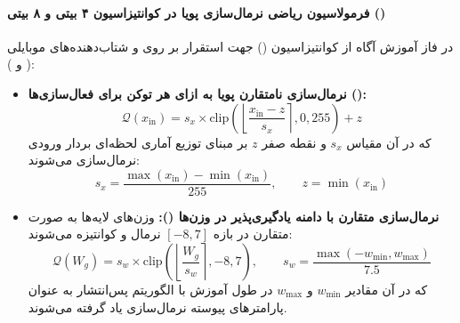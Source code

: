 \paragraph*{فرمولاسیون ریاضی نرمال‌سازی پویا در کوانتیزاسیون ۴ بیتی و ۸ بیتی ()}
در فاز آموزش آگاه از کوانتیزاسیون () جهت استقرار بر روی  و شتاب‌دهنده‌های موبایلی ( و ):
\begin{itemize}
    \item \textbf{نرمال‌سازی نامتقارن پویا به ازای هر توکن برای فعال‌سازی‌ها ():}
    \begin{equation}
        \mathcal{Q}(x_{\text{in}}) = s_x \times \text{clip}\left( \left\lfloor \frac{x_{\text{in}} - z}{s_x} \right\rceil, 0, 255 \right) + z
    \end{equation}
    که در آن مقیاس $s_x$ و نقطه صفر $z$ بر مبنای توزیع آماری لحظه‌ای بردار ورودی نرمال‌سازی می‌شوند:
    \begin{equation}
        s_x = \frac{\max(x_{\text{in}}) - \min(x_{\text{in}})}{255}, \qquad z = \min(x_{\text{in}})
    \end{equation}
    \item \textbf{نرمال‌سازی متقارن با دامنه یادگیری‌پذیر در وزن‌ها ():}
    وزن‌های لایه‌ها به صورت متقارن در بازه $[-8, 7]$ نرمال و کوانتیزه می‌شوند:
    \begin{equation}
        \mathcal{Q}(W_g) = s_w \times \text{clip}\left( \left\lfloor \frac{W_g}{s_w} \right\rceil, -8, 7 \right), \qquad s_w = \frac{\max(-w_{\min}, w_{\max})}{7.5}
    \end{equation}
    که در آن مقادیر $w_{\min}$ و $w_{\max}$ در طول آموزش با الگوریتم پس‌انتشار به عنوان پارامترهای پیوسته نرمال‌سازی یاد گرفته می‌شوند.
\end{itemize}

